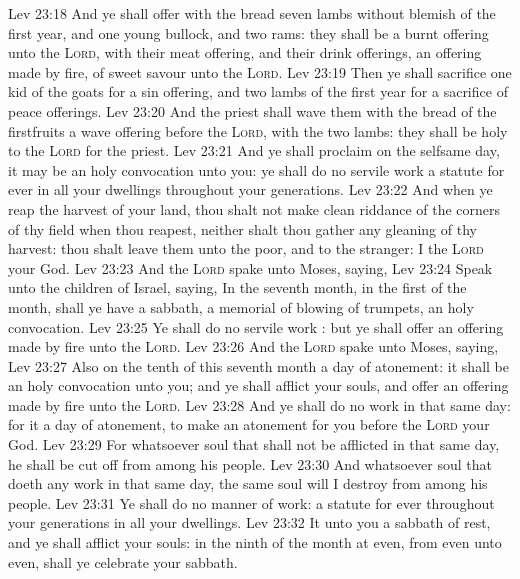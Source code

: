 \vs Lev 23:18 And ye shall offer with the bread seven lambs without blemish of the first year, and one young bullock, and two rams: they shall be  a burnt offering unto the \textsc{Lord}, with their meat offering, and their drink offerings,  an offering made by fire, of sweet savour unto the \textsc{Lord}.
\vs Lev 23:19 Then ye shall sacrifice one kid of the goats for a sin offering, and two lambs of the first year for a sacrifice of peace offerings.
\vs Lev 23:20 And the priest shall wave them with the bread of the firstfruits  a wave offering before the \textsc{Lord}, with the two lambs: they shall be holy to the \textsc{Lord} for the priest.
\vs Lev 23:21 And ye shall proclaim on the selfsame day,  it may be an holy convocation unto you: ye shall do no servile work  a statute for ever in all your dwellings throughout your generations.
\vs Lev 23:22 And when ye reap the harvest of your land, thou shalt not make clean riddance of the corners of thy field when thou reapest, neither shalt thou gather any gleaning of thy harvest: thou shalt leave them unto the poor, and to the stranger: I  the \textsc{Lord} your God.
\vs Lev 23:23 And the \textsc{Lord} spake unto Moses, saying,
\vs Lev 23:24 Speak unto the children of Israel, saying, In the seventh month, in the first  of the month, shall ye have a sabbath, a memorial of blowing of trumpets, an holy convocation.
\vs Lev 23:25 Ye shall do no servile work : but ye shall offer an offering made by fire unto the \textsc{Lord}.
\vs Lev 23:26 And the \textsc{Lord} spake unto Moses, saying,
\vs Lev 23:27 Also on the tenth  of this seventh month  a day of atonement: it shall be an holy convocation unto you; and ye shall afflict your souls, and offer an offering made by fire unto the \textsc{Lord}.
\vs Lev 23:28 And ye shall do no work in that same day: for it  a day of atonement, to make an atonement for you before the \textsc{Lord} your God.
\vs Lev 23:29 For whatsoever soul  that shall not be afflicted in that same day, he shall be cut off from among his people.
\vs Lev 23:30 And whatsoever soul  that doeth any work in that same day, the same soul will I destroy from among his people.
\vs Lev 23:31 Ye shall do no manner of work:  a statute for ever throughout your generations in all your dwellings.
\vs Lev 23:32 It  unto you a sabbath of rest, and ye shall afflict your souls: in the ninth  of the month at even, from even unto even, shall ye celebrate your sabbath.

